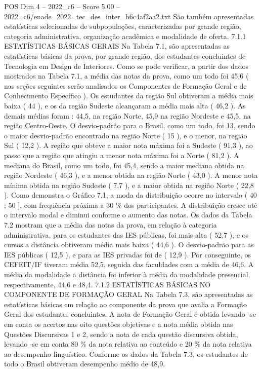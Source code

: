 \begin{textsample}{POS Dim 4 – 2022\_c6 – Score 5.00 – 2022\_c6/enade\_2022\_tec\_des\_inter\_b6c4af2aa2.txt}
São também apresentadas estatísticas selecionadas de subpopulações, caracterizadas por grande região, categoria administrativa, organização acadêmica e modalidade de oferta. 7.1.1 ESTATÍSTICAS BÁSICAS GERAIS Na Tabela 7.1, são apresentadas as estatísticas básicas da prova, por grande região, dos estudantes concluintes de Tecnologia em Design de Interiores.
Como se pode verificar, a partir dos dados mostrados na Tabela 7.1, a média das notas da prova, como um todo foi 45,6 ( nas seções seguintes serão analisados os Componentes de Formação Geral e de Conhecimento Específico ).
Os estudantes da região Sul obtiveram a média mais baixa ( 44 ), e os da região Sudeste alcançaram a média mais alta ( 46,2 ).
As demais médias foram : 44,5, na região Norte, 45,9 na região Nordeste e 45,5, na região Centro-Oeste.
O desvio-padrão para o Brasil, como um todo, foi 13, sendo o maior desvio-padrão encontrado na região Norte ( 15 ), e o menor, na região Sul ( 12,2 ).
A região que obteve a maior nota máxima foi a Sudeste ( 91,3 ), ao passo que a região que atingiu a menor nota máxima foi a Norte ( 81,2 ).
A mediana do Brasil, como um todo, foi 45,4, sendo a maior mediana obtida na região Nordeste ( 46,3 ), e a menor obtida na região Norte ( 43,0 ).
A menor nota mínima obtida na região Sudeste ( 7,7 ), e a maior obtida na região Norte ( 22,8 ).
Como demonstra o Gráfico 7.1, a moda da distribuição ocorre no intervalo ( 40 ; 50 ], com frequência próxima a 30 \% dos participantes.
A distribuição cresce até o intervalo modal e diminui conforme o aumento das notas.
Os dados da Tabela 7.2 mostram que a média das notas da prova, em relação à categoria administrativa, para os estudantes das IES públicas, foi mais alta ( 52,7 ), e os cursos a distância obtiveram média mais baixa ( 44,6 ).
O desvio-padrão para as IES públicas ( 12,5 ), e para as IES privadas foi de ( 12,9 ).
Por conseguinte, os CEFEIT/IF tiveram média 52,5, seguida das faculdades com a média de 46,6.
A média da modalidade a distância foi inferior à média da modalidade presencial, respectivamente, 44,6 e 48,4. 7.1.2 ESTATÍSTICAS BÁSICAS NO COMPONENTE DE FORMAÇÃO GERAL Na Tabela 7.3, são apresentadas as estatísticas básicas em relação ao componente da prova que avalia a Formação Geral dos estudantes concluintes.
A nota de Formação Geral é obtida levando -se em conta os acertos nas oito questões objetivas e a nota média obtida nas Questões Discursivas 1 e 2, sendo a nota de cada questão discursiva obtida, levando -se em conta 80 \% da nota relativa ao conteúdo e 20 \% da nota relativa ao desempenho linguístico.
Conforme os dados da Tabela 7.3, os estudantes de todo o Brasil obtiveram desempenho médio de 48,9.

\end{textsample}
